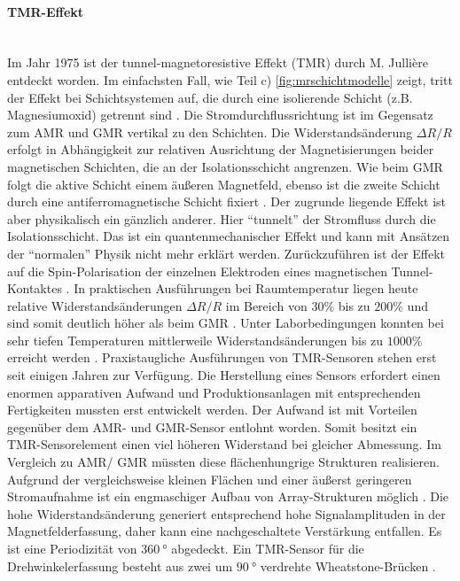 \paragraph{TMR-Effekt}\label{par:TMR}$~$\\


Im Jahr 1975 ist der tunnel-magnetoresistive Effekt (TMR) durch M. Jullière entdeckt worden. Im einfachsten Fall, wie Teil c) \autoref{fig:mrschichtmodelle} zeigt, tritt der Effekt bei Schichtsystemen auf, die durch eine isolierende Schicht (z.B. Magnesiumoxid) getrennt sind \cite{Lemme2016}. Die Stromdurchflussrichtung ist im Gegensatz zum AMR und GMR vertikal zu den Schichten. Die Widerstandsänderung $\Delta R/R$ erfolgt in Abhängigkeit zur relativen Ausrichtung der Magnetisierungen beider magnetischen Schichten, die an der Isolationsschicht angrenzen.
\newline
Wie beim GMR folgt die aktive Schicht einem äußeren Magnetfeld, ebenso ist die zweite Schicht durch eine antiferromagnetische Schicht fixiert  \cite{Tille2020}. Der zugrunde liegende Effekt ist aber physikalisch ein gänzlich anderer. Hier ``tunnelt'' der Stromfluss durch die Isolationsschicht. Das ist ein quantenmechanischer Effekt und kann mit Ansätzen der ``normalen'' Physik nicht mehr erklärt werden. Zurückzuführen ist der Effekt auf die Spin-Polarisation der einzelnen Elektroden eines magnetischen Tunnel-Kontaktes \cite{Tille2020}.
\newline
In praktischen Ausführungen bei Raumtemperatur liegen heute relative Widerstandsänderungen $\Delta R/R$ im Bereich von $30\%$ bis zu $200\%$ und sind somit deutlich höher als beim GMR \cite{Tille2020}. Unter Laborbedingungen konnten bei sehr tiefen Temperaturen mittlerweile Widerstandsänderungen bis zu $1000\%$ erreicht werden \cite{Lemme2016}.
\newline
Praxistaugliche Ausführungen von TMR-Sensoren stehen erst seit einigen Jahren zur Verfügung. Die Herstellung eines Sensors erfordert einen enormen apparativen Aufwand und Produktionsanlagen mit entsprechenden Fertigkeiten mussten erst entwickelt werden. Der Aufwand ist mit Vorteilen gegenüber dem AMR- und GMR-Sensor entlohnt worden.
\newline
Somit besitzt ein TMR-Sensorelement einen viel höheren Widerstand bei gleicher Abmessung. Im Vergleich zu AMR/ GMR müssten diese flächenhungrige Strukturen realisieren. Aufgrund der vergleichsweise kleinen Flächen und einer äußerst geringeren Stromaufnahme ist ein engmaschiger Aufbau von Array-Strukturen möglich \cite{Lemme2016}. Die hohe Widerstandsänderung generiert entsprechend hohe Signalamplituden in der Magnetfelderfassung, daher kann eine nachgeschaltete Verstärkung entfallen. Es ist eine Periodizität von $\SI{360}{\degree}$ abgedeckt. Ein TMR-Sensor für die Drehwinkelerfassung besteht aus zwei um $\SI{90}{\degree}$ verdrehte Wheatstone-Brücken \cite{TDK2016}.


